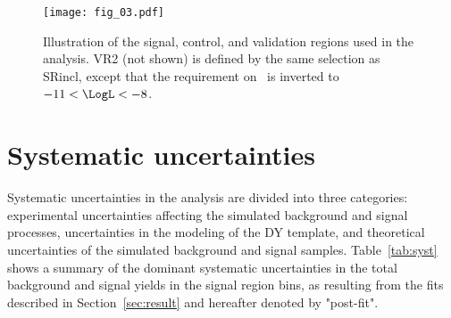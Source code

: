 \documentclass[cernpreprint, backref=false, texlive=2020, UKenglish, dvipsnames, block=none, texmf]{atlasdoc}
\begin{document}
 
 
\begin{figure}
\centering
\texttt{[image: fig\_03.pdf]}
\caption{Illustration of the signal, control, and validation regions used in the analysis. VR2 (not shown) is defined by the same selection as SRincl, except that the requirement on \LogL\ is inverted to $-11 < \LogL < -8$.}
\label{regionsPic}
\end{figure}
\section{Systematic uncertainties}
Systematic uncertainties in the analysis are divided into three
categories: experimental uncertainties affecting the simulated background and signal processes, uncertainties in the modeling of the DY template, and theoretical uncertainties of the simulated background and signal samples.
Table~\ref{tab:syst} shows a summary of the dominant systematic uncertainties in the total background and signal yields in the signal region bins, as resulting from the fits described in Section~\ref{sec:result} and hereafter denoted by "post-fit".
 
\end{document}
